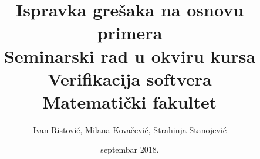 \documentclass[a4paper]{article}
\begin{document}
\title{Ispravka gre\v{s}aka na osnovu primera\\ \small{Seminarski rad u okviru kursa\\Verifikacija softvera\\ Matematički fakultet}}

\author{\href{mailto:mi14031@matf.bg.ac.rs}{Ivan Ristović}, \href{mailto:mi14042@matf.bg.ac.rs}{Milana Kovačević}, \href{mailto:mi14207@matf.bg.ac.rs}{Strahinja Stanojević}}
\date{septembar 2018.}
\maketitle

\setcounter{tocdepth}{1}
\tableofcontents

\newpage





\appendix


\end{document}

